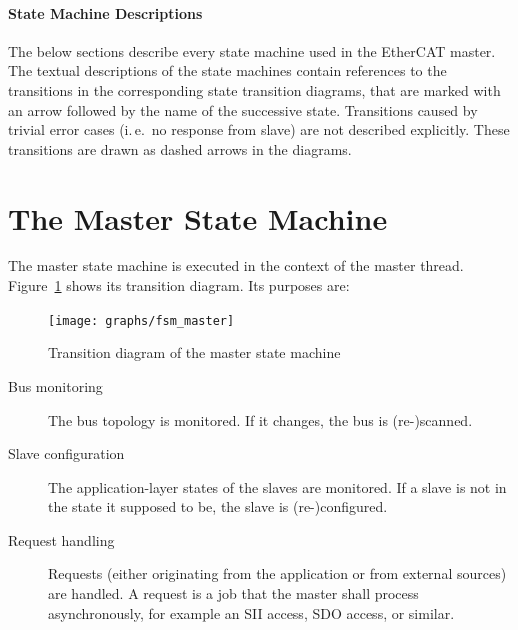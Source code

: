 \documentclass[a4paper,12pt,BCOR6mm,bibtotoc,idxtotoc]{scrbook}
\begin{document}
\paragraph{State Machine Descriptions}

The below sections describe every state machine used in the EtherCAT master.
The textual descriptions of the state machines contain references to the
transitions in the corresponding state transition diagrams, that are marked
with an arrow followed by the name of the successive state. Transitions caused
by trivial error cases (i.\,e.\ no response from slave) are not described
explicitly. These transitions are drawn as dashed arrows in the diagrams.


\section{The Master State Machine}
\label{sec:fsm-master}

The master state machine is executed in the context of the master thread.
Figure~\ref{fig:fsm-master} shows its transition diagram. Its purposes are:

\begin{figure}[htbp]
  \centering
  \texttt{[image: graphs/fsm\_master]}
  \caption{Transition diagram of the master state machine}
  \label{fig:fsm-master}
\end{figure}

\begin{description}

\item[Bus monitoring] The bus topology is monitored. If it changes, the bus is
(re-)scanned.

\item[Slave configuration] The application-layer states of the slaves are
monitored. If a slave is not in the state it supposed to be, the slave is
(re-)configured.

\item[Request handling] Requests (either originating from the application or
from external sources) are handled. A request is a job that the master shall
process asynchronously, for example an SII access, SDO access, or similar.

\end{description}

\end{document}
